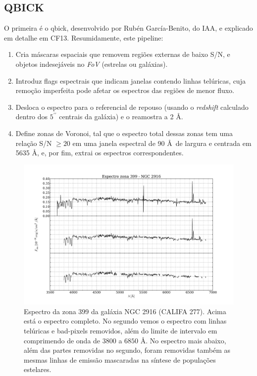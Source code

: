 \subsection{QBICK}

O primeira é o {\sc qbick}, desenvolvido por Rubén García-Benito, do IAA, e explicado em detalhe em CF13. Resumidamente,
este pipeline:

\begin{enumerate}
\item Cria máscaras espaciais que removem regiões externas de baixo S/N, e objetos indesejáveis no {\em FoV} (estrelas
ou galáxias).
\item Introduz flags espectrais que indicam janelas contendo linhas telúricas, cuja remoção imperfeita pode afetar os
espectros das regiões de menor fluxo.
\item Desloca o espectro para o referencial de repouso (usando o {\em redshift} calculado dentro dos $5^{\prime\prime}$
centrais da galáxia) e o reamostra a 2 \AA.
\item Define zonas de Voronoi, tal que o espectro total dessas zonas tem uma relação S/N $\ge 20$ em uma janela
espectral de 90 \AA\ de largura e centrada em 5635 \AA, e, por fim, extrai os espectros correspondentes.
\end{enumerate}

\begin{figure}
    \includegraphics[width=1.0\textwidth]{figuras/K0277-constant_inital_mask-399.pdf}
    \caption[Exemplo de máscaras em um espectro do cubo de dados.]
    {Espectro da zona 399 da galáxia NGC 2916 (CALIFA 277). Acima está o espectro completo. No segundo vemos o espectro
    com linhas telúricas e bad-pixels removidos, além do limite de intervalo em comprimendo de onda de $3800$ a $6850$
    \AA. No espectro mais abaixo, além das partes removidas no segundo, foram removidas também as mesmas linhas de
    emissão mascaradas na síntese de populações estelares.}
    \label{fig:checkmask}
\end{figure}

